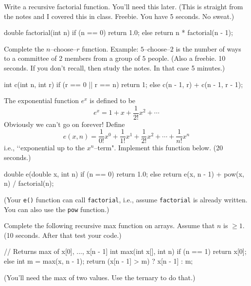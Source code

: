 

\nextq
Write a recursive factorial function.
You'll need this later.
(This is straight from the notes and I covered this in class.
Freebie.
You have 5 seconds. No sweat.)
\\
\ANSWER
\begin{answercode}
double factorial(int n)
{
  if (n == 0) return 1.0;
  else return n * factorial(n - 1);
}
\end{answercode}

\nextq
Complete the $n$--choose--$r$ function.
Example: $5$--choose--$2$ is the number of ways to a committee of 2 members from
a group of $5$ people.
(Also a freebie. 10 seconds. If you don't recall, then study the notes.
In that case 5 minutes.)
\\
\ANSWER
\begin{answercode}
int c(int n, int r)
{
  if (r == 0 || r == n) return 1;
  else  c(n - 1, r) + c(n - 1, r - 1);
}
\end{answercode}

\nextq
The exponential function $e^x$ is defined to be
\[
e^{x} = 1 + x + \frac{1}{2!} x^2 + \cdots
\]
Obviously we can't go on forever!
Define
\[
e(x, n) =
\frac{1}{0!} x^0 +
\frac{1}{1!} x^1 +
\frac{1}{2!} x^2 + \cdots +
\frac{1}{n!} x^n
\]
i.e., \lq\lq exponential up to the $x^n$--term".
Implement this function below.
(20 seconds.)
\\
\ANSWER
\begin{answercode}
double e(double x, int n)
{
  if (n == 0) return 1.0;
  else return e(x, n - 1) + pow(x, n) / factorial(n);
}
\end{answercode}
(Your \verb!e()! function can call \verb!factorial!, i.e., assume
\verb!factorial! is already written. You can also use the \verb!pow! function.)

\nextq
Complete the following recursive max function on arrays.
Assume that $n$ is $\geq 1$.
(10 seconds. After that test your code.)
\\
\ANSWER
\begin{answercode}
// Returns max of x[0], ..., x[n - 1]
int max(int x[], int n)
{
  if (n == 1) return x[0];
  else
  {
    int m = max(x, n - 1);
    return (x[n - 1] > m) ? x[n - 1] : m;
  }
}
\end{answercode}
(You'll need the max of two values. Use the ternary to do that.)

